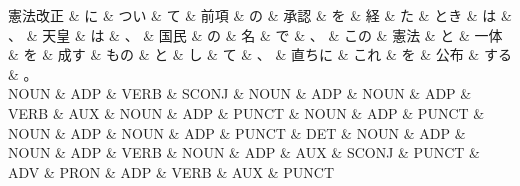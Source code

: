 \documentclass[tikz,border=5pt]{standalone}
\begin{document}
\small
\begin{dependency}[edge unit distance=10.0pt]
    \begin{deptext}[column sep=0.5em]
        憲法改正 \& に \& つい \& て \& 前項 \& の \& 承認 \& を \& 経 \& た \& とき \& は \& 、 \& 天皇 \& は \& 、 \& 国民 \& の \& 名 \& で \& 、 \& この \& 憲法 \& と \& 一体 \& を \& 成す \& もの \& と \& し \& て \& 、 \& 直ちに \& これ \& を \& 公布 \& する \& 。\\
        NOUN \& ADP \& VERB \& SCONJ \& NOUN \& ADP \& NOUN \& ADP \& VERB \& AUX \& NOUN \& ADP \& PUNCT \& NOUN \& ADP \& PUNCT \& NOUN \& ADP \& NOUN \& ADP \& PUNCT \& DET \& NOUN \& ADP \& NOUN \& ADP \& VERB \& NOUN \& ADP \& AUX \& SCONJ \& PUNCT \& ADV \& PRON \& ADP \& VERB \& AUX \& PUNCT\\
    \end{deptext}
\end{dependency}
\end{document}
